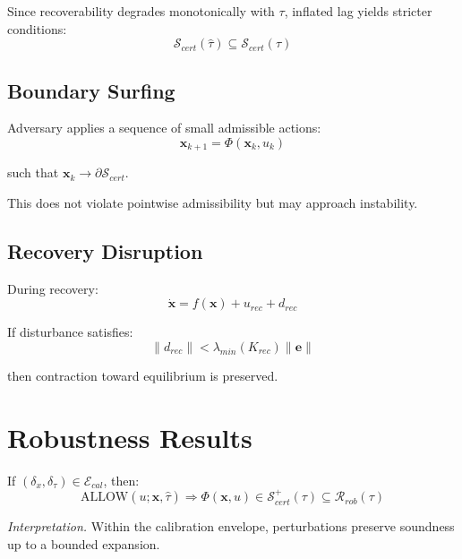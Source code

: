 \documentclass[letterpaper, 10 pt, conference]{ieeeconf}
\begin{document}
Since recoverability degrades monotonically with $\tau$, inflated lag yields stricter conditions:
\begin{equation}
\mathcal{S}_{cert}(\hat{\tau}) \subseteq \mathcal{S}_{cert}(\tau)
\end{equation}

\subsection{Boundary Surfing}

Adversary applies a sequence of small admissible actions:
\begin{equation}
\mathbf{x}_{k+1} = \Phi(\mathbf{x}_k, u_k)
\end{equation}

such that $\mathbf{x}_k \to \partial \mathcal{S}_{cert}$.

This does not violate pointwise admissibility but may approach instability.

\subsection{Recovery Disruption}

During recovery:
\begin{equation}
\dot{\mathbf{x}} = f(\mathbf{x}) + u_{rec} + d_{rec}
\end{equation}

If disturbance satisfies:
\begin{equation}
\|d_{rec}\| < \lambda_{min}(K_{rec}) \|\mathbf{e}\|
\end{equation}

then contraction toward equilibrium is preserved.

\section{Robustness Results}

\begin{theorem}
If $(\delta_x,\delta_\tau) \in \mathcal{E}_{cal}$, then:
\begin{equation}
\text{ALLOW}(u;\hat{\mathbf{x}},\hat{\tau})
\Rightarrow
\Phi(\mathbf{x},u) \in \mathcal{S}_{cert}^+(\tau)
\subseteq
\mathcal{R}_{rob}(\tau)
\end{equation}
\end{theorem}

\textit{Interpretation.}
Within the calibration envelope, perturbations preserve soundness up to a bounded expansion.
\end{document}

